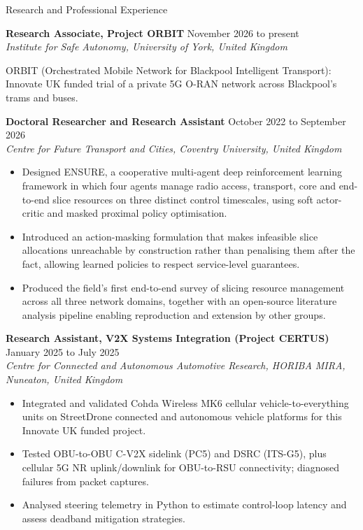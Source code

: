 \documentclass{resume}
\newcommand{\entry}[2]{{\bf #1} \hfill {#2}\\}
\newcommand{\sub}[1]{{\em #1}\par}
\begin{document}
\begin{rSection}{Research and Professional Experience}

\entry{Research Associate, Project ORBIT}{November 2026 to present}
\sub{Institute for Safe Autonomy, University of York, United Kingdom}
ORBIT (Orchestrated Mobile Network for Blackpool Intelligent Transport): Innovate UK funded trial of a private 5G O-RAN network across Blackpool's trams and buses.\par\smallskip

\entry{Doctoral Researcher and Research Assistant}{October 2022 to September 2026}
\sub{Centre for Future Transport and Cities, Coventry University, United Kingdom}
\begin{itemize}
  \item Designed ENSURE, a cooperative multi-agent deep reinforcement learning framework in which four agents manage radio access, transport, core and end-to-end slice resources on three distinct control timescales, using soft actor-critic and masked proximal policy optimisation.
  \item Introduced an action-masking formulation that makes infeasible slice allocations unreachable by construction rather than penalising them after the fact, allowing learned policies to respect service-level guarantees.
  \item Produced the field's first end-to-end survey of slicing resource management across all three network domains, together with an open-source literature analysis pipeline enabling reproduction and extension by other groups.
\end{itemize}

\entry{Research Assistant, V2X Systems Integration (Project CERTUS)}{January 2025 to July 2025}
\sub{Centre for Connected and Autonomous Automotive Research, HORIBA MIRA, Nuneaton, United Kingdom}
\begin{itemize}
  \item Integrated and validated Cohda Wireless MK6 cellular vehicle-to-everything units on StreetDrone connected and autonomous vehicle platforms for this Innovate UK funded project.
  \item Tested OBU-to-OBU C-V2X sidelink (PC5) and DSRC (ITS-G5), plus cellular 5G NR uplink/downlink for OBU-to-RSU connectivity; diagnosed failures from packet captures.
  \item Analysed steering telemetry in Python to estimate control-loop latency and assess deadband mitigation strategies.
\end{itemize}


\end{rSection}
\end{document}
